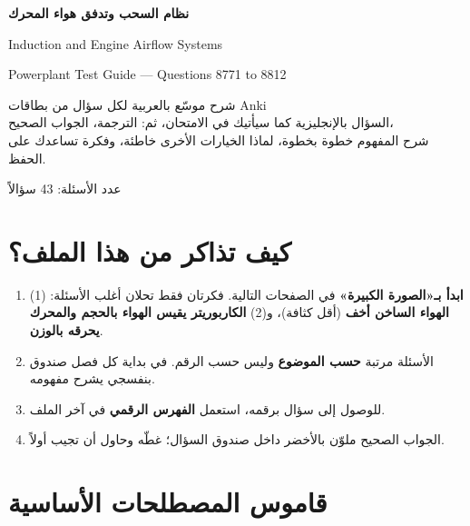 \documentclass[11pt,a4paper]{article}
\newcommand{\en}[1]{\textenglish{#1}}
\begin{document}
\begin{titlepage}
\centering
\vspace*{2cm}
{\Huge\bfseries\textcolor{qframe}{نظام السحب وتدفق هواء المحرك}\par}
\vspace{0.6cm}
{\LARGE\en{Induction and Engine Airflow Systems}\par}
\vspace{0.4cm}
{\large\en{Powerplant Test Guide — Questions 8771 to 8812}\par}
\vspace{1.5cm}
\begin{tcolorbox}[colback=qback,colframe=qframe,width=0.85\linewidth,arc=2mm]
\centering
شرح موسّع بالعربية لكل سؤال من بطاقات \en{Anki}\\[4pt]
السؤال بالإنجليزية كما سيأتيك في الامتحان، ثم: الترجمة، الجواب الصحيح،\\
شرح المفهوم خطوة بخطوة، لماذا الخيارات الأخرى خاطئة، وفكرة تساعدك على الحفظ.
\end{tcolorbox}
\vfill
{\large عدد الأسئلة: 43 سؤالاً}
\end{titlepage}

\tableofcontents
\newpage

\section*{كيف تذاكر من هذا الملف؟}

\begin{enumerate}[label=\arabic*.]
  \item \textbf{ابدأ بـ«الصورة الكبيرة»} في الصفحات التالية. فكرتان فقط تحلان أغلب الأسئلة: (1) \textbf{الهواء الساخن أخف} (أقل كثافة)، و(2) \textbf{الكاربوريتر يقيس الهواء بالحجم والمحرك يحرقه بالوزن}.
  \item الأسئلة مرتبة \textbf{حسب الموضوع} وليس حسب الرقم. في بداية كل فصل صندوق بنفسجي يشرح مفهومه.
  \item للوصول إلى سؤال برقمه، استعمل \textbf{الفهرس الرقمي} في آخر الملف.
  \item الجواب الصحيح ملوّن بالأخضر داخل صندوق السؤال؛ غطّه وحاول أن تجيب أولاً.
\end{enumerate}

\section{قاموس المصطلحات الأساسية}
\end{document}
